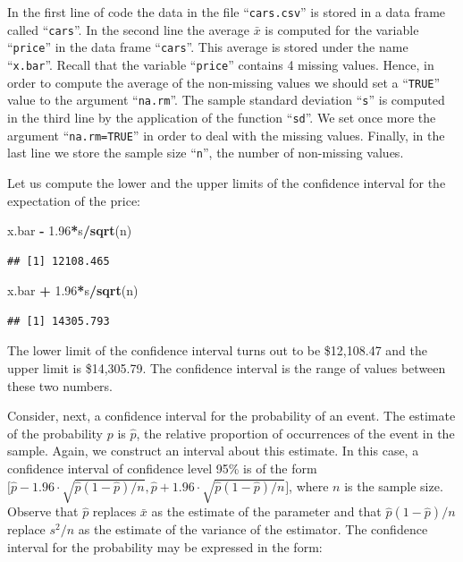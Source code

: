 \documentclass[]{krantz}
\makeatletter
\newenvironment{Shaded}{\begin{snugshade}}{\end{snugshade}}
\newcommand{\KeywordTok}[1]{\textcolor[rgb]{0.13,0.29,0.53}{\textbf{#1}}}
\newcommand{\FloatTok}[1]{\textcolor[rgb]{0.00,0.00,0.81}{#1}}
\newcommand{\StringTok}[1]{\textcolor[rgb]{0.31,0.60,0.02}{#1}}
\newcommand{\OperatorTok}[1]{\textcolor[rgb]{0.81,0.36,0.00}{\textbf{#1}}}
\newcommand{\NormalTok}[1]{#1}
\newenvironment{kframe}{%
\medskip{}
\setlength{\fboxsep}{.8em}
 \def\at@end@of@kframe{}%
 \ifinner\ifhmode%
  \def\at@end@of@kframe{\end{minipage}}%
  \begin{minipage}{\columnwidth}%
 \fi\fi%
 \def\FrameCommand##1{\hskip\@totalleftmargin \hskip-\fboxsep
 \colorbox{shadecolor}{##1}\hskip-\fboxsep
     \hskip-\linewidth \hskip-\@totalleftmargin \hskip\columnwidth}%
 \MakeFramed {\advance\hsize-\width
   \@totalleftmargin\z@ \linewidth\hsize
   \@setminipage}}%
 {\par\unskip\endMakeFramed%
 \at@end@of@kframe}
\renewenvironment{Shaded}{\begin{kframe}}{\end{kframe}}
\theoremstyle{definition}
\theoremstyle{definition}
\theoremstyle{definition}
\theoremstyle{remark}
\makeatother
\begin{document}
In the first line of code the data in the file ``\texttt{cars.csv}'' is
stored in a data frame called ``\texttt{cars}''. In the second line the
average \(\bar x\) is computed for the variable ``\texttt{price}'' in
the data frame ``\texttt{cars}''. This average is stored under the name
``\texttt{x.bar}''. Recall that the variable ``\texttt{price}'' contains
4 missing values. Hence, in order to compute the average of the
non-missing values we should set a ``\texttt{TRUE}'' value to the
argument ``\texttt{na.rm}''. The sample standard deviation
``\texttt{s}'' is computed in the third line by the application of the
function ``\texttt{sd}''. We set once more the argument
``\texttt{na.rm=TRUE}'' in order to deal with the missing values.
Finally, in the last line we store the sample size ``\texttt{n}'', the
number of non-missing values.

Let us compute the lower and the upper limits of the confidence interval
for the expectation of the price:

\begin{Shaded}
\begin{Highlighting}[]
\NormalTok{x.bar }\OperatorTok{-}\StringTok{ }\FloatTok{1.96}\OperatorTok{*}\NormalTok{s}\OperatorTok{/}\KeywordTok{sqrt}\NormalTok{(n)}
\end{Highlighting}
\end{Shaded}

\begin{verbatim}
## [1] 12108.465
\end{verbatim}

\begin{Shaded}
\begin{Highlighting}[]
\NormalTok{x.bar }\OperatorTok{+}\StringTok{ }\FloatTok{1.96}\OperatorTok{*}\NormalTok{s}\OperatorTok{/}\KeywordTok{sqrt}\NormalTok{(n)}
\end{Highlighting}
\end{Shaded}

\begin{verbatim}
## [1] 14305.793
\end{verbatim}

The lower limit of the confidence interval turns out to be \$12,108.47
and the upper limit is \$14,305.79. The confidence interval is the range
of values between these two numbers.

Consider, next, a confidence interval for the probability of an event.
The estimate of the probability \(p\) is \(\hat p\), the relative
proportion of occurrences of the event in the sample. Again, we
construct an interval about this estimate. In this case, a confidence
interval of confidence level 95\% is of the form
\(\big[\hat p - 1.96 \cdot \sqrt{\hat p(1-\hat p)/n}, \hat p + 1.96 \cdot \sqrt{\hat p(1-\hat p)/n}\big]\),
where \(n\) is the sample size. Observe that \(\hat p\) replaces
\(\bar x\) as the estimate of the parameter and that
\(\hat p(1-\hat p)/n\) replace \(s^2/n\) as the estimate of the variance
of the estimator. The confidence interval for the probability may be
expressed in the form:
\end{document}
